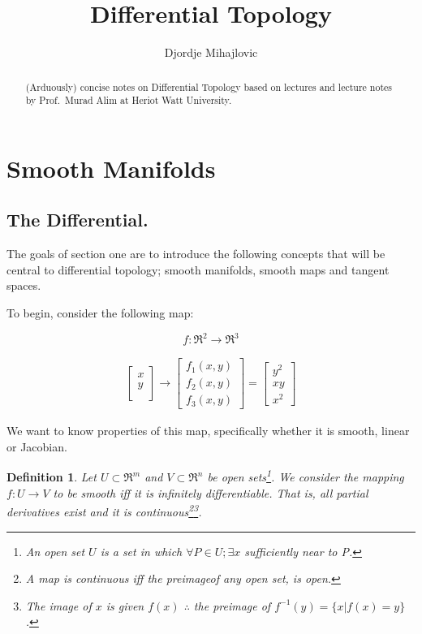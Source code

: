 \documentclass{article}
\title{Differential Topology}
\author{Djordje Mihajlovic}
\newtheorem{definition}{Definition}
\begin{document}
\maketitle

\begin{abstract}
\centering
(Arduously) concise notes on Differential Topology based on lectures and lecture notes by Prof.\ Murad Alim at Heriot Watt University.
\end{abstract}

\section{Smooth Manifolds}

\subsection{The Differential.}

The goals of section one are to introduce the following concepts that will be central to differential topology; smooth manifolds, smooth maps and tangent spaces.

To begin, consider the following map:

$$f: \Re^{2} \rightarrow \Re^{3}$$

\begin{align}
        \begin{bmatrix}
           x \\
           y \\
         \end{bmatrix}
         \rightarrow
         \begin{bmatrix}
             f_{1}(x, y) \\
             f_{2} (x, y) \\
             f_{3} (x, y)
         \end{bmatrix} 
         = 
         \begin{bmatrix}
             y^{2} \\ 
             xy \\
             x^{2}
         \end{bmatrix}
\end{align}

We want to know properties of this map, specifically whether it is smooth, linear or Jacobian.

\begin{definition}
  Let $U \subset \Re^{m}$ and $V \subset \Re^{n}$ be open sets\footnote{An open set $U$ is a set in which $\forall P\in U; \exists x$ sufficiently near to P.}.
  We consider the mapping $f: U \rightarrow V$ to be smooth iff it is infinitely differentiable. That is, all partial derivatives exist and it is continuous\footnote{A map is continuous iff the preimageof any open set, is open.}\footnote{The image of $x$ is given $f(x)$ $\therefore$ the preimage of $f^{-1}(y) = \{ x| f(x) = y \}$.}.
\end{definition}
\end{document}
